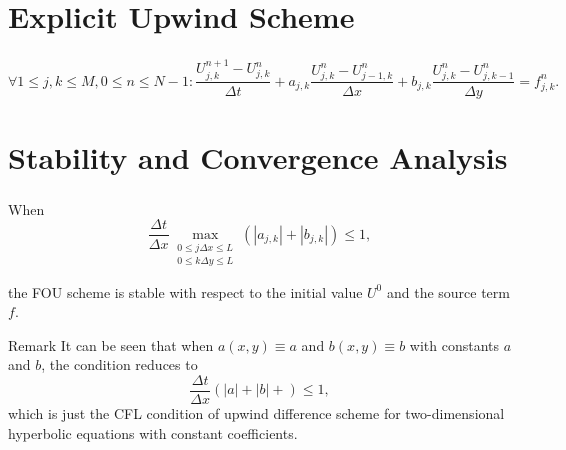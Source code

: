 \section{Explicit Upwind Scheme}

\begin{frame}
    \frametitle{\secname}

    \begin{equation*}
        \forall
        1\leq j,k\leq M,
        0\leq n\leq N-1:
        \frac{U^{n+1}_{j,k}-U^{n}_{j,k}}{\Delta t}+
        a_{j,k}
        \frac{U^{n}_{j,k}-U^{n}_{j-1,k}}{\Delta x}+
        b_{j,k}
        \frac{U^{n}_{j,k}-U^{n}_{j,k-1}}{\Delta y}=
        f^{n}_{j,k}.
    \end{equation*}
\end{frame}

\section{Stability and Convergence Analysis}

\begin{frame}
    \frametitle{\secname}

    \begin{theorem}\normalfont
        When
        \begin{equation}
            \frac{\Delta t}{\Delta x}
            \max\limits_{
                \substack{
                    0\leq j\Delta x\leq L\\
                    0\leq k\Delta y \leq L}
            }
            \left(
            \left|a_{j,k}\right|+
            \left|b_{j,k}\right|
            \right)
            \leq
            1,
        \end{equation}

        the FOU scheme is stable with respect to the initial value
        $U^{0}$ and the source term $f$.
    \end{theorem}

    \begin{alertblock}{Remark}
        It can be seen that when
        \begin{math}
            a\left(x,y\right)\equiv
            a
        \end{math}
        and
        \begin{math}
            b\left(x,y\right)\equiv
            b
        \end{math}
        with constants $a$ and $b$, the condition
        reduces to
        \begin{equation}
            \frac{\Delta t}{\Delta x}
            \left(
            \left|a\right|+
            \left|b\right|+
            \right)\leq
            1,
        \end{equation}
        which is just the CFL condition of upwind difference scheme for two-dimensional hyperbolic equations with constant coefficients.
    \end{alertblock}
\end{frame}

